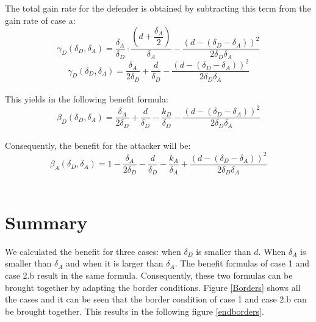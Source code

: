 The total gain rate for the defender is obtained by subtracting this term from the gain rate of case a:
 \begin{equation*}
\gamma_{D}(\delta_{D},\delta_{A}) = \dfrac{\delta_{A}}{\delta_{D}} \cdot \dfrac{(d+\dfrac{\delta_{A}}{2})}{\delta_{A}} - \dfrac{(d - (\delta_{D} - \delta_{A}))^{2}}{2 \delta_{D} \delta_{A}}
\end{equation*}
\begin{equation*}
\gamma_{D}(\delta_{D},\delta_{A}) = \dfrac{\delta_{A}}{2\delta_{D}} + \dfrac{d}{\delta_{D}} - \dfrac{(d - (\delta_{D} - \delta_{A}))^{2}}{2 \delta_{D} \delta_{A}}
\end{equation*}\\
This yields in the following benefit formula:
\begin{equation}\label{benfcase2b:defender}
\beta_{D}(\delta_{D},\delta_{A}) = \dfrac{\delta_{A}}{2\delta_{D}} + \dfrac{d}{\delta_{D}} - \dfrac{k_{D}}{ \delta_{D}} - \dfrac{(d - (\delta_{D} - \delta_{A}))^{2}}{2 \delta_{D} \delta_{A}}
\end{equation}\\
 
Consequently, the benefit for the attacker will be:
\begin{equation}\label{benfcase2b:attacker}
\beta_{A}(\delta_{D},\delta_{A}) = 1 -\dfrac{\delta_{A}}{2\delta_{D}} - \dfrac{d}{\delta_{D}} - \dfrac{k_{A}}{ \delta_{A}} + \dfrac{(d - (\delta_{D} - \delta_{A}))^{2}}{2 \delta_{D} \delta_{A}}
\end{equation}\\

\section{Summary}

We calculated the benefit for three cases: when $\delta_{D}$ is smaller than $d$. When $\delta_{A}$ is smaller than $\delta_{A}$ and when it is larger than $\delta_{A}$.
The benefit formulas of case 1 and case 2.b result in the same formula. Consequently, these two formulas can be brought together by adapting the border conditions. Figure \ref{Borders} shows all the cases and it can be seen that the border condition of case 1 and case 2.b can be brought together. This results in the following figure \ref{endborders}. \\

